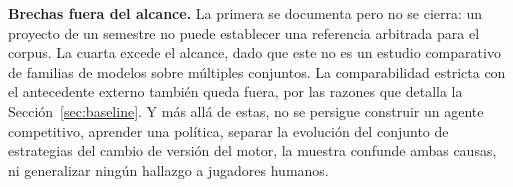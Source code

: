 \noindent\textbf{Brechas fuera del alcance.} La primera se documenta pero no
se cierra: un proyecto de un semestre no puede establecer una referencia
arbitrada para el corpus. La cuarta excede el alcance, dado que este no es un
estudio comparativo de familias de modelos sobre múltiples conjuntos. La
comparabilidad estricta con el antecedente externo también queda fuera, por
las razones que detalla la Sección~\ref{sec:baseline}. Y más allá de estas,
no se persigue construir un agente competitivo, aprender una política,
separar la evolución del conjunto de estrategias del cambio de versión del
motor, la muestra confunde ambas causas, ni generalizar ningún hallazgo
a jugadores humanos.
